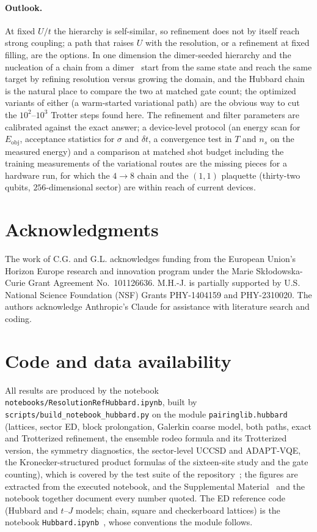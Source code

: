\documentclass[a4paper,11pt,noarxiv]{quantumarticle}
\newcommand{\Eobj}{E_{\mathrm{obj}}}
\newcommand{\SM}{Supplemental Material~\cite{SM}}
\begin{document}
\paragraph{Outlook.}
At fixed $U/t$ the hierarchy is self-similar, so refinement does not by
itself reach strong coupling; a path that raises $U$ with the resolution,
or a refinement at fixed filling, are the options.  In one dimension the
dimer-seeded hierarchy and the nucleation of a chain from a
dimer~\cite{Sadia2026} start from the same state and reach the same target
by refining resolution versus growing the domain, and the Hubbard chain is
the natural place to compare the two at matched gate count; the optimized
variants of either (a warm-started variational path) are the obvious way to
cut the $10^2$--$10^3$ Trotter steps found here.  The refinement and filter
parameters are calibrated against the exact answer; a device-level protocol
(an energy scan for $\Eobj$, acceptance statistics for $\sigma$ and
$\delta t$, a convergence test in $T$ and $n_s$ on the measured energy) and
a comparison at matched shot budget including the training measurements of
the variational routes are the missing pieces for a hardware run, for which
the $4\to8$ chain and the $(1,1)$ plaquette (thirty-two qubits,
$256$-dimensional sector) are within reach of current devices.

\section*{Acknowledgments}
The work of C.G. and G.L. acknowledges funding from the European Union's
Horizon Europe research and innovation program under the Marie
Sk\l{}odowska-Curie Grant Agreement No.\ 101126636.  M.H.-J. is partially
supported by U.S. National Science Foundation (NSF) Grants PHY-1404159 and
PHY-2310020.  The authors acknowledge Anthropic's Claude for assistance with
literature search and coding.

\section*{Code and data availability}
\label{sec:code}
All results are produced by the notebook
\texttt{notebooks/ResolutionRefHubbard.ipynb}, built by
\texttt{scripts/build\_notebook\_hubbard.py} on the module
\texttt{pairinglib.hubbard} (lattices, sector ED, block prolongation,
Galerkin coarse model, both paths, exact and Trotterized refinement, the
ensemble rodeo formula and its Trotterized version, the symmetry
diagnostics, the sector-level UCCSD and ADAPT-VQE, the Kronecker-structured
product formulas of the sixteen-site study and the gate counting), which is
covered by the test suite of the repository~\cite{Code}; the figures are
extracted from the executed notebook, and the \SM{} and the notebook
together document every number quoted.  The ED reference code (Hubbard and
$t$--$J$ models; chain, square and checkerboard lattices) is the notebook
\texttt{Hubbard.ipynb}~\cite{HubbardNotebook}, whose conventions the module
follows.
\end{document}
